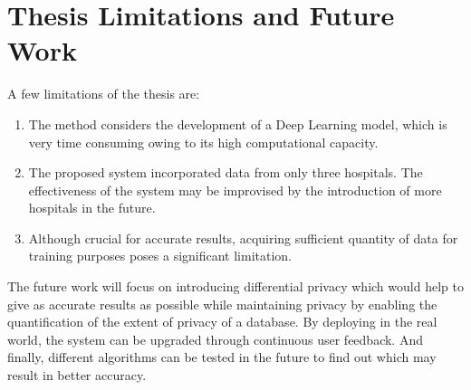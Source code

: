 \section{Thesis Limitations and Future Work}
A few limitations of the thesis are: 
\begin{enumerate}
    \item
    The method considers the development of a Deep Learning model, which is very time consuming owing to its high computational capacity.
    \item
    The proposed system incorporated data from only three hospitals. The effectiveness of the system may be improvised by the introduction of more hospitals in the future.
    \item
    Although crucial for accurate results, acquiring sufficient quantity of data for training purposes poses a significant limitation.
    
\end{enumerate}
The future work will focus on introducing differential privacy which would help to give as accurate results as possible while maintaining privacy by enabling the quantification of the extent of privacy of a database. By deploying in the real world, the system can be upgraded through continuous user feedback. And finally, different algorithms can be tested in the future to find out which may result in better accuracy.



\endinput